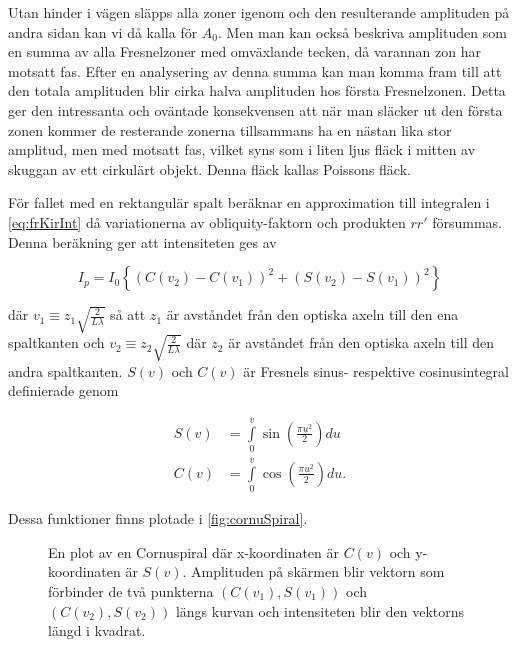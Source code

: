 \documentclass[a4paper]{article}
\begin{document}
Utan hinder i vägen släpps alla zoner igenom och den resulterande amplituden på andra sidan kan vi då kalla för $A_0$. Men man kan också beskriva amplituden som en summa av alla Fresnelzoner med omväxlande tecken, då varannan zon har motsatt fas. Efter en analysering av denna summa kan man komma fram till att den totala amplituden blir cirka halva amplituden hos första Fresnelzonen. Detta ger den intressanta och oväntade konsekvensen att när man släcker ut den första zonen kommer de resterande zonerna tillsammans ha en nästan lika stor amplitud, men med motsatt fas, vilket syns som i liten ljus fläck i mitten av skuggan av ett cirkulärt objekt. Denna fläck kallas Poissons fläck.
\cite{pearsonIntroOpt}

För fallet med en rektangulär spalt beräknar \cite[pp.~340--342]{pearsonIntroOpt} en approximation till integralen i \eqref{eq:frKirInt} då variationerna av obliquity-faktorn och produkten $r r'$ försummas. Denna beräkning ger att intensiteten ges av

\begin{equation}
	I_p = I_0 \left\{\left(C(v_2) - C(v_1)\right)^2 + \left(S(v_2) - S(v_1)\right)^2\right\}
	\label{eq:rectApFre}
\end{equation}

där $v_1\equiv z_1\sqrt{\frac{2}{L\lambda}}$ så att $z_1$ är avståndet från den optiska axeln till den ena spaltkanten och $v_2\equiv z_2\sqrt{\frac{2}{L\lambda}}$ där $z_2$ är avståndet från den optiska axeln till den andra spaltkanten. $S(v)$ och $C(v)$ är Fresnels sinus- respektive cosinusintegral definierade genom

\begin{align}
	S(v) &= \int\limits_0^v \sin\left(\frac{\pi u^2}{2}\right) d u \\
	C(v) &= \int\limits_0^v \cos\left(\frac{\pi u^2}{2}\right) d u\text{.}
\end{align}

Dessa funktioner finns plotade i \autoref{fig:cornuSpiral}.

\begin{figure}[ht]
	\centering
	\caption{En plot av en Cornuspiral där x-koordinaten är $C(v)$ och y-koordinaten är $S(v)$. Amplituden på skärmen blir vektorn som förbinder de två punkterna $(C(v_1), S(v_1))$ och $(C(v_2), S(v_2))$ längs kurvan och intensiteten blir den vektorns längd i kvadrat.}
	\label{fig:cornuSpiral}
\end{figure}
\end{document}

